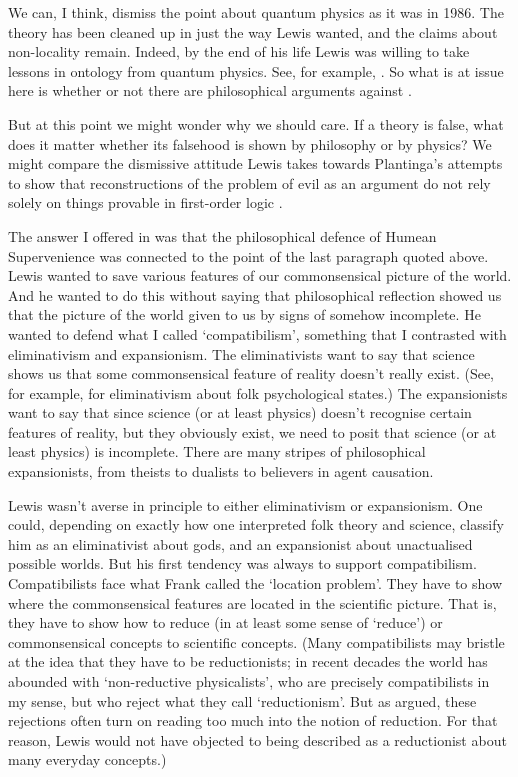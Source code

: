 \noindent  We can, I think, dismiss the point about quantum physics as it was in 1986.  The theory has been cleaned up in just the way Lewis wanted, and the claims about non-locality remain. Indeed, by the end of his life Lewis was willing to take lessons in ontology from quantum physics. See, for example, \citet{Lewis2004b}.  So what is at issue here is whether or not there are philosophical arguments against \HS.

But at this point we might wonder why we should care. If a theory is false, what does it matter whether its falsehood is shown by philosophy or by physics? We might compare the dismissive attitude Lewis takes towards Plantinga's attempts to show that reconstructions of the problem of evil as an argument do not rely solely on things provable in first-order logic \citep{Lewis1993b}. 

The answer I offered in \citet{Weatherson2009-WEADL} was that the philosophical defence of Hu\-m\-ean Supervenience was connected to the point of the last paragraph quoted above. Lewis wanted to save various features of our commonsensical picture of the world. And he wanted to do this without saying that philosophical reflection showed us that the picture of the world given to us by signs of somehow incomplete.  He wanted to defend what I called `compatibilism', something that I contrasted with eliminativism and expansionism. The eliminativists want to say that science shows us that some commonsensical feature of reality doesn't really exist. (See, for example, \citet{Churchland1981} for eliminativism about folk psychological states.) The expansionists want to say that since science (or at least physics) doesn't recognise certain features of reality, but they obviously exist, we need to posit that science (or at least physics) is incomplete. There are many stripes of philosophical expansionists, from theists to dualists to believers in agent causation.

Lewis wasn't averse in principle to either eliminativism or expansionism. One could, depending on exactly how one interpreted folk theory and science, classify him as an eliminativist about gods, and an expansionist about unactualised possible worlds. But his first tendency was always to support compatibilism. Compatibilists face what Frank \citet{Jackson1998} called the `location problem'. They have to show where the commonsensical features are located in the scientific picture. That is, they have to show how to reduce (in at least some sense of `reduce') or commonsensical concepts to scientific concepts. (Many compatibilists may bristle at the idea that they have to be reductionists; in recent decades the world has abounded with `non-reductive physicalists', who are precisely compatibilists in my sense, but who reject what they call `reductionism'. But as \citet{Lewis1994b} argued, these rejections often turn on reading too much into the notion of reduction. For that reason, Lewis would not have objected to being described as a reductionist about many everyday concepts.)

